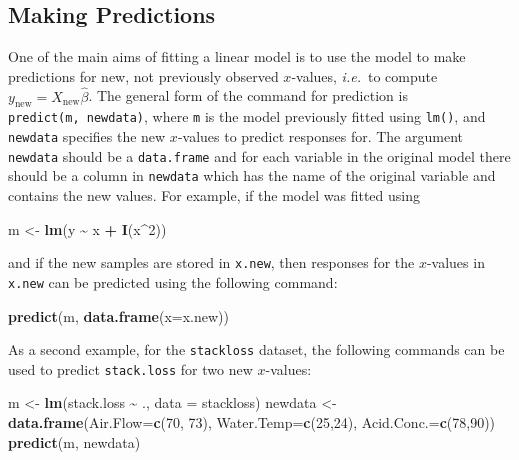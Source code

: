 \documentclass[
  a4paper,
]{article}
\newenvironment{Shaded}{\begin{snugshade}}{\end{snugshade}}
\newcommand{\AttributeTok}[1]{\textcolor[rgb]{0.13,0.29,0.53}{#1}}
\newcommand{\DecValTok}[1]{\textcolor[rgb]{0.00,0.00,0.81}{#1}}
\newcommand{\FunctionTok}[1]{\textcolor[rgb]{0.13,0.29,0.53}{\textbf{#1}}}
\newcommand{\NormalTok}[1]{#1}
\newcommand{\OtherTok}[1]{\textcolor[rgb]{0.56,0.35,0.01}{#1}}
\newcommand{\SpecialCharTok}[1]{\textcolor[rgb]{0.81,0.36,0.00}{\textbf{#1}}}
\theoremstyle{definition}
\theoremstyle{definition}
\theoremstyle{definition}
\theoremstyle{definition}
\theoremstyle{remark}
\begin{document}
\subsection*{Making Predictions}\label{lm-predict}

One of the main aims of fitting a linear model is to use the model to make
predictions for new, not previously observed \(x\)-values, \emph{i.e.}~to compute
\(y_{\mathrm{new}} = X_{\mathrm{new}} \hat\beta\). The general form of the
command for prediction is \texttt{predict(m,\ newdata)}, where \texttt{m} is the model
previously fitted using \texttt{lm()}, and \texttt{newdata} specifies the new \(x\)-values to
predict responses for. The argument \texttt{newdata} should be a \texttt{data.frame} and
for each variable in the original model there should be a column in \texttt{newdata}
which has the name of the original variable and contains the new values. For
example, if the model was fitted using

\begin{Shaded}
\begin{Highlighting}[]
\NormalTok{  m }\OtherTok{\textless{}{-}} \FunctionTok{lm}\NormalTok{(y }\SpecialCharTok{\textasciitilde{}}\NormalTok{ x }\SpecialCharTok{+} \FunctionTok{I}\NormalTok{(x}\SpecialCharTok{\^{}}\DecValTok{2}\NormalTok{))}
\end{Highlighting}
\end{Shaded}

and if the new samples are stored in \texttt{x.new}, then responses for
the \(x\)-values in \texttt{x.new} can be predicted using the following
command:

\begin{Shaded}
\begin{Highlighting}[]
  \FunctionTok{predict}\NormalTok{(m, }\FunctionTok{data.frame}\NormalTok{(}\AttributeTok{x=}\NormalTok{x.new))}
\end{Highlighting}
\end{Shaded}

As a second example, for the \texttt{stackloss} dataset, the following
commands can be used to predict \texttt{stack.loss} for two new
\(x\)-values:

\begin{Shaded}
\begin{Highlighting}[]
\NormalTok{  m }\OtherTok{\textless{}{-}} \FunctionTok{lm}\NormalTok{(stack.loss }\SpecialCharTok{\textasciitilde{}}\NormalTok{ ., }\AttributeTok{data =}\NormalTok{ stackloss)}
\NormalTok{  newdata }\OtherTok{\textless{}{-}} \FunctionTok{data.frame}\NormalTok{(}\AttributeTok{Air.Flow=}\FunctionTok{c}\NormalTok{(}\DecValTok{70}\NormalTok{, }\DecValTok{73}\NormalTok{), }\AttributeTok{Water.Temp=}\FunctionTok{c}\NormalTok{(}\DecValTok{25}\NormalTok{,}\DecValTok{24}\NormalTok{), }\AttributeTok{Acid.Conc.=}\FunctionTok{c}\NormalTok{(}\DecValTok{78}\NormalTok{,}\DecValTok{90}\NormalTok{))}
  \FunctionTok{predict}\NormalTok{(m, newdata)}
\end{Highlighting}
\end{Shaded}
\end{document}
